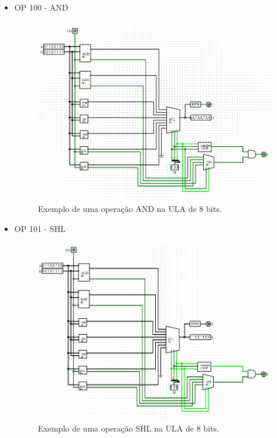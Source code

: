 \documentclass[
	12pt,				%
	openright,			%
	twoside,			%
	a4paper,			%
	english,			%
	french,				%
	spanish,			%
	brazil,				%
	]{abntex2}
\begin{document}
\begin{apendicesenv}
\begin{itemize}
\newpage
\item{OP 100 - AND}

\begin{figure}[H]
	\begin{center}
	    \includegraphics[scale=0.5]{imagens/alu8100and.png}
	\end{center}
\caption{\label{alu8100and}Exemplo de uma operação AND na ULA de 8 bits.}
\end{figure}

\newpage
\item{OP 101 - SHL}

\begin{figure}[H]
	\begin{center}
	    \includegraphics[scale=0.5]{imagens/alu8101shl.png}
	\end{center}
\caption{\label{alu8101shl}Exemplo de uma operação SHL na ULA de 8 bits.}
\end{figure}


\end{itemize}
\end{apendicesenv}
\end{document}
